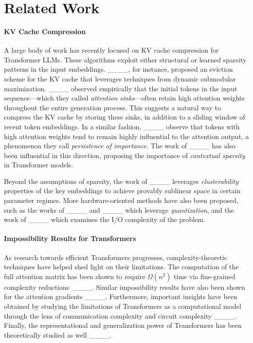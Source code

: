 \section{Related Work}
\paragraph{KV Cache Compression}
A large body of work has recently focused on KV cache compression for Transformer LLMs. 
%
These algorithms exploit either structural or learned sparsity patterns in the input embeddings.
%
____, for instance, proposed an eviction scheme for the KV cache that leverages techniques from dynamic submodular maximization. 
%
____ observed empirically that the initial tokens in the input sequence---which they called \textit{attention sinks}---often retain high attention weights throughout the entire generation process. 
%
This suggests a natural way to compress the KV cache by storing these sinks, in addition to a sliding window of recent token embeddings. 
%
In a similar fashion, ____ observe that tokens with high attention weights tend to remain highly influential to the attention output, a phenomenon they call \textit{persistence of importance}. 
%
The work of ____ has also been influential in this direction, proposing the importance of \textit{contextual sparsity} in Transformer models. 

Beyond the assumptions of sparsity, the work of ____ leverages \textit{clusterability} properties of the key embeddings to achieve provably sublinear space in certain parameter regimes. 
%
More hardware-oriented methods have also been proposed, such as the works of ____ and ____ which leverage \textit{quantization}, and the work of ____ which examines the I/O complexity of the problem.

\paragraph{Impossibility Results for Transformers}
As research towards efficient Transformers progresses, complexity-theoretic techniques have helped shed light on their limitations.
%
The computation of the full attention matrix has been shown to require $\Omega(n^2)$ time via fine-grained complexity reductions ____. 
%
Similar impossibility results have also been shown for the attention gradients ____.
% 
Furthermore, important insights have been obtained by studying the limitations of Transformers as a computational model through the lens of communication complexity and circuit complexity ____. 
%
Finally, the representational and generalization power of Transformers has been theoretically studied as well ____.